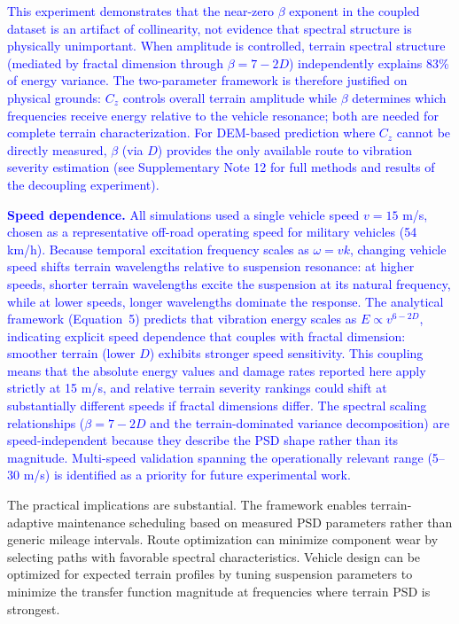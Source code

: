 \documentclass[11pt]{article}
\begin{document}
\textcolor{blue}{This experiment demonstrates that the near-zero $\beta$ exponent in the coupled dataset is an artifact of collinearity, not evidence that spectral structure is physically unimportant. When amplitude is controlled, terrain spectral structure (mediated by fractal dimension through $\beta = 7-2D$) independently explains 83\% of energy variance. The two-parameter framework is therefore justified on physical grounds: $C_z$ controls overall terrain amplitude while $\beta$ determines which frequencies receive energy relative to the vehicle resonance; both are needed for complete terrain characterization. For DEM-based prediction where $C_z$ cannot be directly measured, $\beta$ (via $D$) provides the only available route to vibration severity estimation (see Supplementary Note 12 for full methods and results of the decoupling experiment).}

\textcolor{blue}{\textbf{Speed dependence.} All simulations used a single vehicle speed $v = 15$ m/s, chosen as a representative off-road operating speed for military vehicles (54 km/h). Because temporal excitation frequency scales as $\omega = vk$, changing vehicle speed shifts terrain wavelengths relative to suspension resonance: at higher speeds, shorter terrain wavelengths excite the suspension at its natural frequency, while at lower speeds, longer wavelengths dominate the response. The analytical framework (Equation~5) predicts that vibration energy scales as $E \propto v^{6-2D}$, indicating explicit speed dependence that couples with fractal dimension: smoother terrain (lower $D$) exhibits stronger speed sensitivity. This coupling means that the absolute energy values and damage rates reported here apply strictly at 15 m/s, and relative terrain severity rankings could shift at substantially different speeds if fractal dimensions differ. The spectral scaling relationships ($\beta = 7-2D$ and the terrain-dominated variance decomposition) are speed-independent because they describe the PSD shape rather than its magnitude. Multi-speed validation spanning the operationally relevant range (5--30 m/s) is identified as a priority for future experimental work.}

The practical implications are substantial. The framework enables terrain-adaptive maintenance scheduling based on measured PSD parameters rather than generic mileage intervals. Route optimization can minimize component wear by selecting paths with favorable spectral characteristics. Vehicle design can be optimized for expected terrain profiles by tuning suspension parameters to minimize the transfer function magnitude at frequencies where terrain PSD is strongest.
\end{document}
